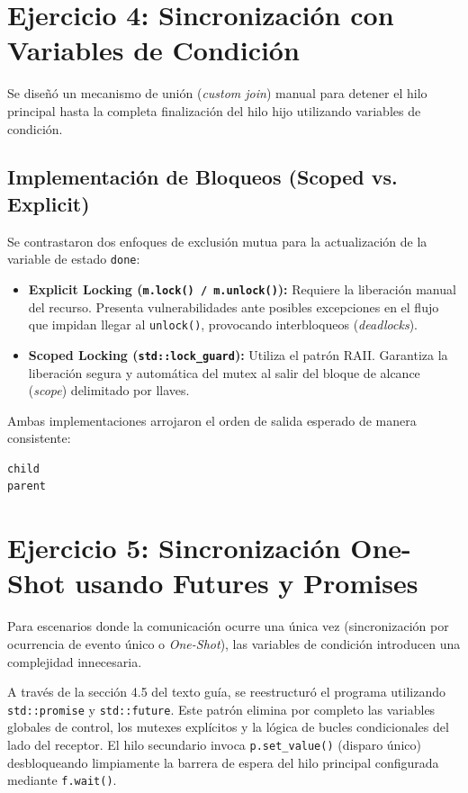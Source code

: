 \documentclass[11pt,a4paper]{article}
\begin{document}
\newpage
\section{Ejercicio 4: Sincronización con Variables de Condición}
Se diseñó un mecanismo de unión (\textit{custom join}) manual para detener el hilo principal hasta la completa finalización del hilo hijo utilizando variables de condición.

\subsection{Implementación de Bloqueos (Scoped vs. Explicit)}
Se contrastaron dos enfoques de exclusión mutua para la actualización de la variable de estado \texttt{done}:
\begin{itemize}
    \item \textbf{Explicit Locking (\texttt{m.lock() / m.unlock()}):} Requiere la liberación manual del recurso. Presenta vulnerabilidades ante posibles excepciones en el flujo que impidan llegar al \texttt{unlock()}, provocando interbloqueos (\textit{deadlocks}).
    \item \textbf{Scoped Locking (\texttt{std::lock\_guard}):} Utiliza el patrón RAII. Garantiza la liberación segura y automática del mutex al salir del bloque de alcance (\textit{scope}) delimitado por llaves.
\end{itemize}

Ambas implementaciones arrojaron el orden de salida esperado de manera consistente:
\begin{lstlisting}[language=bash]
child
parent
\end{lstlisting}

\section{Ejercicio 5: Sincronización One-Shot usando Futures y Promises}
Para escenarios donde la comunicación ocurre una única vez (sincronización por ocurrencia de evento único o \textit{One-Shot}), las variables de condición introducen una complejidad innecesaria.

A través de la sección 4.5 del texto guía, se reestructuró el programa utilizando \texttt{std::promise} y \texttt{std::future}. Este patrón elimina por completo las variables globales de control, los mutexes explícitos y la lógica de bucles condicionales del lado del receptor. El hilo secundario invoca \texttt{p.set\_value()} (disparo único) desbloqueando limpiamente la barrera de espera del hilo principal configurada mediante \texttt{f.wait()}.
\end{document}
